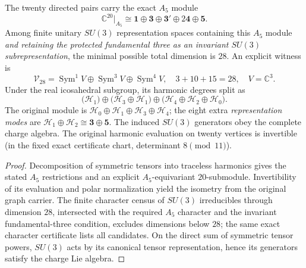 \documentclass[11pt]{article}
\begin{document}
\begin{theorem}
\label{p1b:thm:fullcarrier-minimal-su3-completion}
The twenty directed pairs carry the exact $A_5$ module
\[
 \mathbb C^{20}\big|_{A_5}\cong
 \mathbf1\oplus\mathbf3\oplus\mathbf3'\oplus2\mathbf4\oplus\mathbf5.
\]
Among finite unitary $SU(3)$ representation spaces containing this
$A_5$ module \emph{and retaining the protected fundamental three as
an invariant $SU(3)$ subrepresentation}, the minimal possible total
dimension is $28$.  An explicit witness is
\[
 \boxed{\mathcal V_{28}=\operatorname{Sym}^1V\oplus
 \operatorname{Sym}^3V\oplus\operatorname{Sym}^4V,
 \quad 3+10+15=28,\quad V=\mathbb C^3.}
\]
Under the real icosahedral subgroup, its harmonic degrees split as
\[
 \bigl(\mathcal H_1\bigr)\oplus
 \bigl(\mathcal H_3\oplus\mathcal H_1\bigr)\oplus
 \bigl(\mathcal H_4\oplus\mathcal H_2\oplus\mathcal H_0\bigr).
\]
The original module is $\mathcal H_0\oplus\mathcal H_1\oplus
\mathcal H_3\oplus\mathcal H_4$; the eight extra \emph{representation
modes} are $\mathcal H_1\oplus\mathcal H_2\cong\mathbf3\oplus\mathbf5$.
The induced $SU(3)$ generators obey the complete charge algebra.
The original harmonic evaluation on twenty vertices is invertible
(in the fixed exact certificate chart, determinant $8\pmod{11}$).
\end{theorem}
\begin{proof}
Decomposition of symmetric tensors into traceless harmonics gives the
stated $A_5$ restrictions and an explicit $A_5$-equivariant
$20$-submodule.  Invertibility of its evaluation and polar
normalization yield the isometry from the original graph carrier.
The finite character census of $SU(3)$ irreducibles through dimension
$28$, intersected with the required $A_5$ character and the invariant
fundamental-three condition, excludes dimensions below $28$; the
same exact character certificate lists all candidates.  On the direct
sum of symmetric tensor powers, $SU(3)$ acts by its canonical tensor
representation, hence its generators satisfy the charge Lie algebra.
\end{proof}
\end{document}
